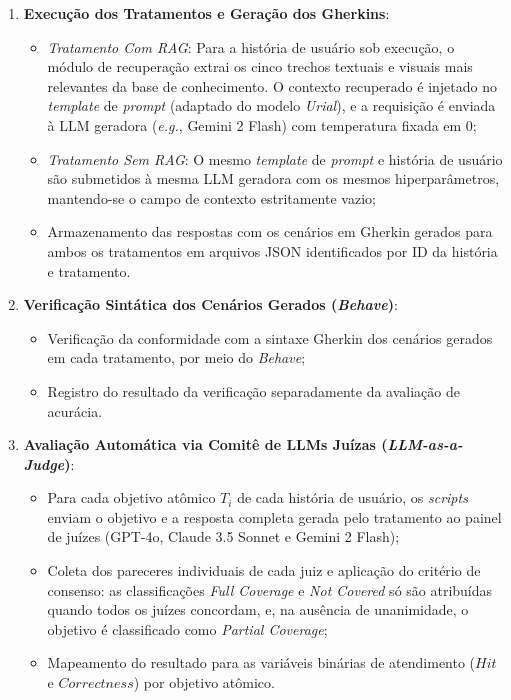 \begin{enumerate}
    \item \textbf{Execução dos Tratamentos e Geração dos Gherkins}:
    \begin{itemize}
        \item \textit{Tratamento Com RAG}: Para a história de usuário sob execução, o módulo de recuperação extrai os cinco trechos textuais e visuais mais relevantes da base de conhecimento. O contexto recuperado é injetado no \textit{template} de \textit{prompt} (adaptado do modelo \textit{Urial}), e a requisição é enviada à LLM geradora (\textit{e.g.}, Gemini 2 Flash) com temperatura fixada em 0;
        \item \textit{Tratamento Sem RAG}: O mesmo \textit{template} de \textit{prompt} e história de usuário são submetidos à mesma LLM geradora com os mesmos hiperparâmetros, mantendo-se o campo de contexto estritamente vazio;
        \item Armazenamento das respostas com os cenários em Gherkin gerados para ambos os tratamentos em arquivos JSON identificados por ID da história e tratamento.
    \end{itemize}

    \item \textbf{Verificação Sintática dos Cenários Gerados (\textit{Behave})}:
    \begin{itemize}
        \item Verificação da conformidade com a sintaxe Gherkin dos cenários gerados em cada tratamento, por meio do \textit{Behave};
        \item Registro do resultado da verificação separadamente da avaliação de acurácia.
    \end{itemize}

    \item \textbf{Avaliação Automática via Comitê de LLMs Juízas (\textit{LLM-as-a-Judge})}:
    \begin{itemize}
        \item Para cada objetivo atômico $T_i$ de cada história de usuário, os \textit{scripts} enviam o objetivo e a resposta completa gerada pelo tratamento ao painel de juízes (GPT-4o, Claude 3.5 Sonnet e Gemini 2 Flash);
        \item Coleta dos pareceres individuais de cada juiz e aplicação do critério de consenso: as classificações \textit{Full Coverage} e \textit{Not Covered} só são atribuídas quando todos os juízes concordam, e, na ausência de unanimidade, o objetivo é classificado como \textit{Partial Coverage};
        \item Mapeamento do resultado para as variáveis binárias de atendimento ($Hit$ e $Correctness$) por objetivo atômico.
    \end{itemize}


\end{enumerate}
